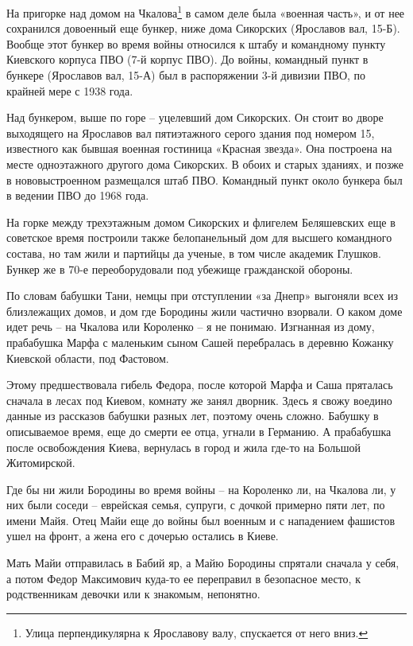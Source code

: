 На пригорке над домом на Чкалова\footnote{Улица перпендикулярна к Ярославову валу, спускается от него вниз.} в самом деле была «военная часть», и от нее сохранился довоенный еще бункер, ниже дома Сикорских (Ярославов вал, 15-Б). Вообще этот бункер во время войны относился к штабу и командному пункту Киевского корпуса ПВО (7-й корпус ПВО). До войны, командный пункт в бункере (Ярославов вал, 15-А) был в распоряжении 3-й дивизии ПВО, по крайней мере с 1938 года.

Над бункером, выше по горе – уцелевший дом Сикорских. Он стоит во дворе выходящего на Ярославов вал пятиэтажного серого здания под номером 15, известного как бывшая военная гостиница «Красная звезда». Она построена на месте одноэтажного другого дома Сикорских. В обоих и старых зданиях, и позже в нововыстроенном размещался штаб ПВО. Командный пункт около бункера был в ведении ПВО до 1968 года.

На горке между трехэтажным домом Сикорских и флигелем Беляшевских еще в советское время построили также белопанельный дом для высшего командного состава, но там жили и партийцы да ученые, в том числе академик Глушков. Бункер же в 70-е переоборудовали под убежище гражданской обороны.

По словам бабушки Тани, немцы при отступлении «за Днепр» выгоняли всех из близлежащих домов, и дом где Бородины жили частично взорвали. О каком доме идет речь – на Чкалова или Короленко – я не понимаю. Изгнанная из дому, прабабушка Марфа с маленьким сыном Сашей перебралась в деревню Кожанку Киевской области, под Фастовом. 

Этому предшествовала гибель Федора, после которой Марфа и Саша пряталась сначала в лесах под Киевом, комнату же занял дворник. Здесь я свожу воедино данные из рассказов бабушки разных лет, поэтому очень сложно. Бабушку в описываемое время, еще до смерти ее отца, угнали в Германию. А прабабушка после освобождения Киева, вернулась в город и жила где-то на Большой Житомирской.

Где бы ни жили Бородины во время войны – на Короленко ли, на Чкалова ли, у них были соседи – еврейская семья, супруги, с дочкой примерно пяти лет, по имени Майя. Отец Майи еще до войны был военным и с нападением фашистов ушел на фронт, а жена его с дочерью остались в Киеве.

Мать Майи отправилась в Бабий яр, а Майю Бородины спрятали сначала у себя, а потом Федор Максимович куда-то ее переправил в безопасное место, к родственникам девочки или к знакомым, непонятно.

